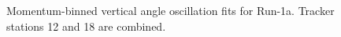 \begin{figure}[]
\caption{Momentum-binned vertical angle oscillation fits for Run-1a. Tracker stations 12 and 18 are combined.}
\label{fig:Run1aMomBinnedFits}
\end{figure} 
\clearpage


